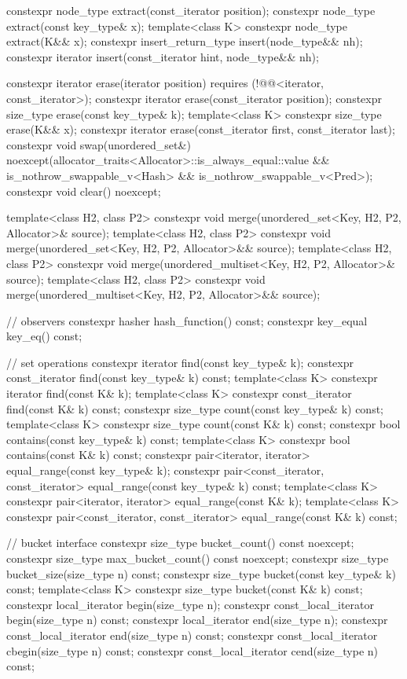 \begin{codeblock}
{{    constexpr node_type extract(const_iterator position);
    constexpr node_type extract(const key_type& x);
    template<class K> constexpr node_type extract(K&& x);
    constexpr insert_return_type insert(node_type&& nh);
    constexpr iterator           insert(const_iterator hint, node_type&& nh);

    constexpr iterator  erase(iterator position)
      requires (!@@<iterator, const_iterator>);
    constexpr iterator  erase(const_iterator position);
    constexpr size_type erase(const key_type& k);
    template<class K> constexpr size_type erase(K&& x);
    constexpr iterator  erase(const_iterator first, const_iterator last);
    constexpr void      swap(unordered_set&)
      noexcept(allocator_traits<Allocator>::is_always_equal::value &&
               is_nothrow_swappable_v<Hash> && is_nothrow_swappable_v<Pred>);
    constexpr void      clear() noexcept;

    template<class H2, class P2>
      constexpr void merge(unordered_set<Key, H2, P2, Allocator>& source);
    template<class H2, class P2>
      constexpr void merge(unordered_set<Key, H2, P2, Allocator>&& source);
    template<class H2, class P2>
      constexpr void merge(unordered_multiset<Key, H2, P2, Allocator>& source);
    template<class H2, class P2>
      constexpr void merge(unordered_multiset<Key, H2, P2, Allocator>&& source);

    // observers
    constexpr hasher hash_function() const;
    constexpr key_equal key_eq() const;

    // set operations
    constexpr iterator         find(const key_type& k);
    constexpr const_iterator   find(const key_type& k) const;
    template<class K>
      constexpr iterator       find(const K& k);
    template<class K>
      constexpr const_iterator find(const K& k) const;
    constexpr size_type        count(const key_type& k) const;
    template<class K>
      constexpr size_type      count(const K& k) const;
    constexpr bool             contains(const key_type& k) const;
    template<class K>
      constexpr bool           contains(const K& k) const;
    constexpr pair<iterator, iterator>               equal_range(const key_type& k);
    constexpr pair<const_iterator, const_iterator>   equal_range(const key_type& k) const;
    template<class K>
      constexpr pair<iterator, iterator>             equal_range(const K& k);
    template<class K>
      constexpr pair<const_iterator, const_iterator> equal_range(const K& k) const;

    // bucket interface
    constexpr size_type bucket_count() const noexcept;
    constexpr size_type max_bucket_count() const noexcept;
    constexpr size_type bucket_size(size_type n) const;
    constexpr size_type bucket(const key_type& k) const;
    template<class K> constexpr size_type bucket(const K& k) const;
    constexpr local_iterator begin(size_type n);
    constexpr const_local_iterator begin(size_type n) const;
    constexpr local_iterator end(size_type n);
    constexpr const_local_iterator end(size_type n) const;
    constexpr const_local_iterator cbegin(size_type n) const;
    constexpr const_local_iterator cend(size_type n) const;

}}
\end{codeblock}
